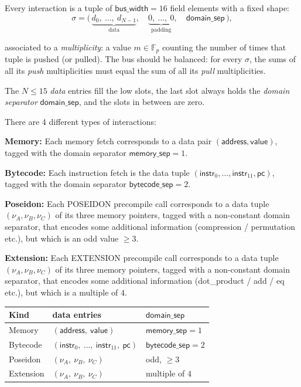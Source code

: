 \documentclass{article}
\theoremstyle{definition}
\newcommand{\Fp}{\mathbb F_p}
\begin{document}
Every interaction is a tuple of $\textsf{bus\_width} = 16$ field elements with a fixed shape:
$$\sigma = \big(\,\underbrace{d_0,\ \dots,\ d_{N-1}}_{\text{data}},\quad \underbrace{0,\ \dots,\ 0}_{\text{padding}},\quad \textsf{domain\_sep}\,\big),$$

associated to a \emph{multiplicity}: a value $m \in \Fp$ counting the number of times that tuple is pushed (or pulled). The bus should be balanced: for every $\sigma$, the sums of all its \emph{push} multiplicities must equal the sum of all its \emph{pull} multiplicities.

The $N \le 15$ \emph{data} entries fill the low slots, the last slot always holds the \emph{domain separator} $\textsf{domain\_sep}$, and the slots in between are zero.



There are 4 different types of interactions:

\textbf{Memory:} Each memory fetch corresponds to a data pair $(\textsf{address}, \textsf{value})$, tagged with the domain separator $\textsf{memory\_sep} = 1$.

\textbf{Bytecode:} Each instruction fetch is the data tuple $(\textsf{instr}_0, \dots, \textsf{instr}_{11}, \textsf{pc})$, tagged with the domain separator $\textsf{bytecode\_sep} = 2$.

\textbf{Poseidon:} Each \textsc{POSEIDON} precompile call corresponds to a data tuple $(\nu_A, \nu_B, \nu_C)$ of its three memory pointers, tagged with a non-constant domain separator, that encodes some additional information (compression / permutation etc.), but which is an odd value $\ge 3$.

\textbf{Extension:} Each \textsc{EXTENSION} precompile call corresponds to a data tuple $(\nu_A, \nu_B, \nu_C)$ of its three memory pointers, tagged with a non-constant domain separator, that encodes some additional information (dot\_product / add / eq etc.), but which is a multiple of $4$.

\begin{center}
\begin{tabular}{lll}
\toprule
Kind & data entries & $\textsf{domain\_sep}$ \\
\midrule
Memory                   & $(\textsf{address},\ \textsf{value})$  & $\textsf{memory\_sep} = 1$ \\
Bytecode                 & $(\textsf{instr}_0,\ \dots,\ \textsf{instr}_{11},\ \textsf{pc})$ & $\textsf{bytecode\_sep} = 2$ \\
Poseidon     & $(\nu_A,\ \nu_B,\ \nu_C)$ & odd, $\ge 3$ \\
Extension & $(\nu_A,\ \nu_B,\ \nu_C)$ & multiple of $4$ \\
\bottomrule
\end{tabular}
\end{center}
\end{document}
